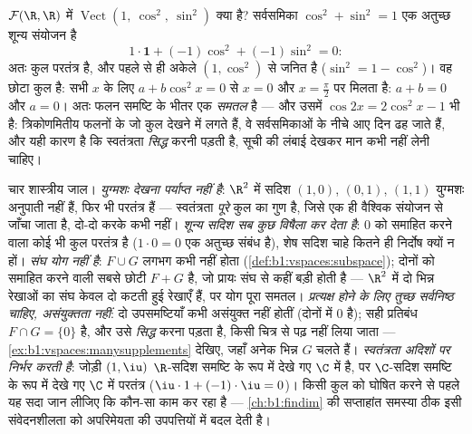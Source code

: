 \begin{example}[एक छिपा संबंध जनित समष्टि को सिकोड़ देता है]
\label{ex:b1:vspaces:hiddenrelation}
$\mathcal{F}(\R, \R)$ में $\operatorname{Vect}(1,\ \cos^2,\ \sin^2)$ क्या
है? सर्वसमिका $\cos^2 + \sin^2 = 1$ एक अतुच्छ शून्य संयोजन है
\[
1\cdot\mathbf{1} + (-1)\cos^2 + (-1)\sin^2 = 0 :
\]
अतः कुल परतंत्र है, और  पहले से ही अकेले $(1, \cos^2)$ से जनित है
($\sin^2 = 1 - \cos^2$)। वह छोटा कुल  है: सभी $x$ के लिए $a +
b\cos^2 x = 0$ से $x = 0$ और $x = \frac\pi2$ पर मिलता है: $a + b = 0$ और $a
= 0$। अतः  फलन समष्टि के भीतर एक \emph{समतल} है --- और उसमें
$\cos 2x = 2\cos^2 x - 1$ भी है: त्रिकोणमितीय फलनों के जो कुल देखने में
 लगते हैं, वे सर्वसमिकाओं के नीचे आए दिन ढह जाते हैं, और यही कारण है
कि स्वतंत्रता \emph{सिद्ध} करनी पड़ती है, सूची की लंबाई देखकर मान कभी नहीं
लेनी चाहिए।
\end{example}

\begin{remark}[सामान्य भूलें]
\label{rem:b1:vspaces:pitfalls}
चार शास्त्रीय जाल। \emph{युग्मशः देखना पर्याप्त नहीं है}: $\R^2$ में सदिश
$(1,0)$, $(0,1)$, $(1,1)$ युग्मशः अनुपाती नहीं हैं, फिर भी परतंत्र हैं ---
स्वतंत्रता \emph{पूरे} कुल का गुण है, जिसे एक ही वैश्विक संयोजन से जाँचा
जाता है, दो-दो करके कभी नहीं। \emph{शून्य सदिश सब कुछ विषैला कर देता है}:
$0$ को समाहित करने वाला कोई भी कुल परतंत्र है ($1\cdot 0 = 0$ एक अतुच्छ
संबंध है), शेष सदिश चाहे कितने ही निर्दोष क्यों न हों। \emph{संघ योग नहीं
है}: $F \cup G$ लगभग कभी  नहीं होता
(\cref{def:b1:vspaces:subspace}); दोनों को समाहित करने वाली सबसे छोटी
 $F + G$ है, जो प्रायः संघ से कहीं बड़ी होती है --- $\R^2$ में दो
भिन्न रेखाओं का संघ केवल दो कटती हुई रेखाएँ हैं, पर योग पूरा समतल।
\emph{प्रत्यक्ष होने के लिए तुच्छ सर्वनिष्ठ चाहिए, असंयुक्तता नहीं}: दो
उपसमष्टियाँ कभी असंयुक्त नहीं होतीं (दोनों में $0$ है); सही प्रतिबंध $F \cap
G = \{0\}$ है, और उसे \emph{सिद्ध} करना पड़ता है, किसी चित्र से पढ़ नहीं
लिया जाता --- \cref{ex:b1:vspaces:manysupplements} देखिए, जहाँ अनेक भिन्न
$G$ चलते हैं। \emph{स्वतंत्रता अदिशों पर निर्भर करती है}: जोड़ी $(1, \iu)$
$\R$-सदिश समष्टि के रूप में देखे गए $\C$ में  है, पर $\C$-सदिश
समष्टि के रूप में देखे गए $\C$ में परतंत्र ($\iu\cdot 1 + (-1)\cdot\iu =
0$)। किसी कुल को  घोषित करने से पहले यह सदा जान लीजिए कि कौन-सा
 काम कर रहा है --- \cref{ch:b1:findim} की सप्ताहांत समस्या ठीक इसी
संवेदनशीलता को अपरिमेयता की उपपत्तियों में बदल देती है।
\end{remark}

